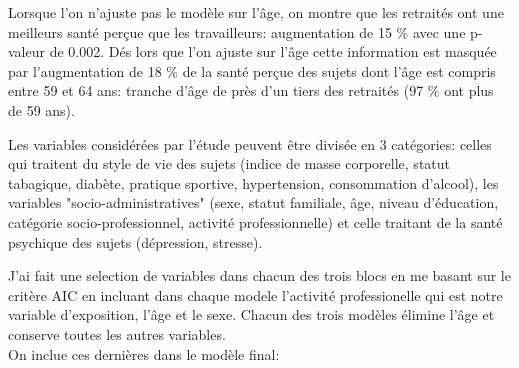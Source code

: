 \documentclass{book}
\begin{document}
Lorsque l'on n'ajuste pas le modèle sur l'âge, on montre que les retraités ont une meilleurs santé perçue que les travailleurs: augmentation de 15 $\%$ avec une p-valeur de 0.002. Dés lors que l'on ajuste sur l'âge cette information est masquée par l'augmentation de 18 $\%$ de la santé perçue des sujets dont l'âge est compris entre 59 et 64 ans: tranche d'âge de près d'un tiers des retraités (97 $\%$ ont plus de 59 ans).

Les variables considérées par l'étude peuvent être divisée en 3 catégories: celles qui traitent du style de vie des sujets (indice de masse corporelle, statut tabagique, diabète, pratique sportive, hypertension, consommation d'alcool), les variables "socio-administratives" (sexe, statut familiale, âge, niveau d'éducation, catégorie socio-professionnel, activité professionnelle) et celle traitant de la santé psychique des sujets (dépression, stresse).

J'ai fait une selection de variables dans chacun des trois blocs en me basant sur le critère AIC en incluant dans chaque modele l'activité professionelle qui est notre variable d'exposition, l'âge et le sexe. Chacun des trois modèles élimine l'âge et conserve toutes les autres variables.\\
On inclue ces dernières dans le modèle final:
  
\end{document}
